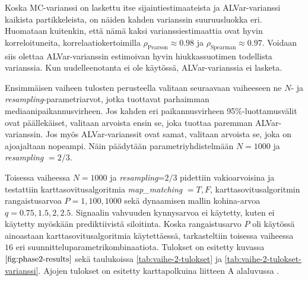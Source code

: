 \documentclass[
  12pt,
  a4paper, twoside]{book}
\begin{document}
Koska MC-varianssi on laskettu itse sijaintiestimaateista ja ALVar-varianssi kaikista partikkeleista, on näiden kahden varianssin suuruusluokka eri. Huomataan kuitenkin, että nämä kaksi varianssiestimaattia ovat hyvin korreloituneita, korrelaatiokertoimilla \(\rho_\text{Pearson} \approx 0.98\) ja \(\rho_\text{Spearman} \approx 0.97\). Voidaan siis olettaa ALVar-varianssin estimoivan hyvin hiukkassuotimen todellista varianssia. Kun uudelleenotanta ei ole käytössä, ALVar-varianssia ei lasketa.

Ensimmäisen vaiheen tulosten perusteella valitaan seuraavaan vaiheeseen ne \(N\)- ja \emph{resampling}-parametriarvot, jotka tuottavat parhaimman mediaanipaikannusvirheen. Jos kahden eri paikannusvirheen 95\%-luottamusvälit ovat päällekäiset, valitaan arvoista ensin se, joka tuottaa paremman ALVar-varianssin. Jos myös ALVar-varianssit ovat samat, valitaan arvoista se, joka on ajoajaltaan nopeampi. Näin päädytään parametriyhdistelmään \(N=1000\) ja \emph{resampling} \(=2/3\).

Toisessa vaiheessa \(N=1000\) ja \emph{resampling}=\(2/3\) pidettiin vakioarvoisina ja testattiin karttasovitusalgoritmia \emph{map\_matching} \(={T,F}\), karttasovitusalgoritmin rangaistusarvoa \(P={1,100,1000}\) sekä dynaamisen mallin kohina-arvoa \(q={0.75,1.5,2,2.5}\). Signaalin vahvuuden kynnysarvoa ei käytetty, kuten ei käytetty myöskään prediktiivistä siloitinta. Koska rangaistusarvo \(P\) oli käytössä ainoastaan karttasovitusalgoritmia käytettäessä, tarkasteltiin toisessa vaiheessa \(16\) eri suunnitteluparametrikombinaatiota. Tulokset on esitetty kuvassa \(\ref{fig:phase2-results}\) sekä taulukoissa \ref{tab:vaihe-2-tulokset} ja \ref{tab:vaihe-2-tulokset-varianssi}. Ajojen tulokset on esitetty karttapolkuina liitteen A alaluvussa .
\end{document}
